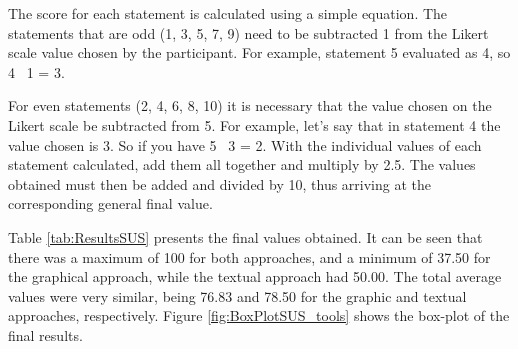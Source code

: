 
The score for each statement is calculated using a simple equation.
The statements that are odd (1, 3, 5, 7, 9) need to be subtracted 1 from the Likert scale value chosen by the participant.
For example, statement 5 evaluated as 4, so 4 \textminus~1 = 3.

For even statements (2, 4, 6, 8, 10) it is necessary that the value chosen on the Likert scale be subtracted from 5.
For example, let's say that in statement 4 the value chosen is 3.
So if you have 5 \textminus~3 = 2.
With the individual values of each statement calculated, add them all together and multiply by 2.5.
The values obtained must then be added and divided by 10, thus arriving at the corresponding general final value.

Table \ref{tab:ResultsSUS} presents the final values obtained.
It can be seen that there was a maximum of 100 for both approaches, and a minimum of 37.50 for the graphical approach, while the textual approach had 50.00.
The total average values were very similar, being 76.83 and 78.50 for the graphic and textual approaches, respectively.
Figure \ref{fig:BoxPlotSUS_tools} shows the box-plot of the final results.

